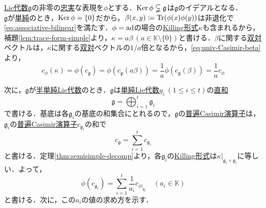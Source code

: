 \documentclass[rep_main]{subfiles}
\begin{document}
\hyperref[ax:LieAlg]{Lie代数}$\mathfrak{g}$の非零の\hyperref[def:faithful]{忠実}な表現を$\phi$とする．$\operatorname{Ker}\phi \subsetneqq \mathfrak{g}$は$\mathfrak{g}$のイデアルとなる．\\
$\mathfrak{g}$が\hyperref[def:simple-LieAlg]{単純}のとき，$\operatorname{Ker}\phi = \{0\}$だから，$\beta(x, y) \coloneqq \Tr(\phi(x)\phi(y))$は非退化で\eqref{eq:associative-bilinear}を満たす．$\phi = \operatorname{ad}$の場合の\hyperref[def:Killing-form]{Killing形式}$\kappa$も含まれるから，補題\ref{lem:trace-form-simple}より，$\kappa = a\beta\ (a \in \mathbb{K} \setminus \{0\})$と書ける．$\beta$に関する\hyperref[lem:Casimir]{双対}ベクトルは，$\kappa$に関する\hyperref[lem:Casimir]{双対}ベクトルの$1/a$倍となるから，\eqref{eq:univ-Casimir-beta}より，
\begin{equation}
	c_\phi(\kappa) = \phi(c_\mathfrak{g}) = \phi(c_\mathfrak{g}(a\beta)) = \frac{1}{a}\phi(c_\mathfrak{g}(\beta)) = \frac{1}{a}c_\phi
\end{equation}

次に，$\mathfrak{g}$が\hyperref[def:semisimple-LieAlg]{半単純Lie代数}のとき．$\mathfrak{g}$は\hyperref[def:simple-LieAlg]{単純Lie代数}$g_i\ (1 \leq i \leq t)$の\hyperref[thm:semisimple-decomp]{直和}
\begin{equation}
	\mathfrak{g} = \bigoplus_{i=1}^t\mathfrak{g}_i
\end{equation}
で書ける．基底は各$\mathfrak{g}_i$の基底の和集合にとれるので，$\mathfrak{g}$の\hyperref[def:univ-Casimir-op]{普遍Casimir演算子}は，$\mathfrak{g}_i$の\hyperref[def:univ-Casimir-op]{普遍Casimir演算子}$c_{\mathfrak{g}_i}$の和で
\begin{equation}
	c_\mathfrak{g} = \sum_{i=1}^t c_{\mathfrak{g}_i}
\end{equation}
と書ける．定理\ref{thm:semisimple-decomp}より，各$\mathfrak{g}_i$の\hyperref[def:Killing-form]{Killing形式}は$\kappa|_{\mathfrak{g}_i \times \mathfrak{g}_i}$に等しい．よって，
\begin{equation}
	\phi(c_{\mathfrak{g}_i}) = \sum_{i=1}^t \frac{1}{a_i}c_{\phi|_{\mathfrak{g}_i}}\quad  (a_i \in \mathbb{K})
\end{equation}
と書ける．次に，この$a_i$の値の求め方を示す．
\end{document}
